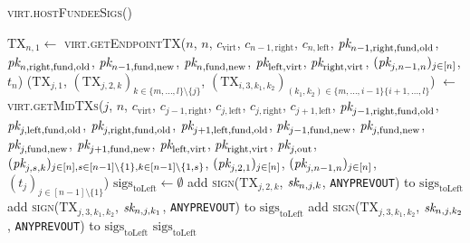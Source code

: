 \begin{center}
  \begin{processbox}{\textsc{virt.hostFundeeSigs}()}
    \begin{algorithmic}[1]
      \State $\mathrm{TX}_{n, 1} \gets$
      \textsc{virt}.\textsc{getEndpointTX}($n$, $n$, $c_{\mathrm{virt}}$,
      $c_{n-1, \mathrm{right}}$, $c_{n, \mathrm{left}}$, $\textit{pk}_{n-1,
      \mathrm{right}, \mathrm{fund}, \mathrm{old}}$, $\textit{pk}_{n, \mathrm{right},
      \mathrm{fund}, \mathrm{old}}$, $\textit{pk}_{n-1, \mathrm{fund}, \mathrm{new}}$,
      $\textit{pk}_{n, \mathrm{fund}, \mathrm{new}}$, $\textit{pk}_{\mathrm{left},
      \mathrm{virt}}$, $\textit{pk}_{\mathrm{right}, \mathrm{virt}}$, $(\textit{pk}_{j, n-1,
      n})_{j \in [n]}$, $t_n$)
      \label{code:virtual-layer:fundee-sigs:tx}
        \State ($\mathrm{TX}_{j, 1}$, $(\mathrm{TX}_{j, 2, k})_{k \in \{m,
        \dots, l\} \setminus \{j\}}$, $(\mathrm{TX}_{i, 3, k_1, k_2})_{(k_1,
        k_2) \in \{m, \dots, i-1\} \{i+1, \dots, l\}}$) $\gets$
        \textsc{virt.getMidTXs}($j$, $n$, $c_{\mathrm{virt}}$, $c_{j-1,
        \mathrm{right}}$, $c_{j, \mathrm{left}}$, $c_{j, \mathrm{right}}$,
        $c_{j+1, \mathrm{left}}$, $\textit{pk}_{j-1, \mathrm{right}, \mathrm{fund},
        \mathrm{old}}$, $\textit{pk}_{j, \mathrm{left}, \mathrm{fund}, \mathrm{old}}$,
        $\textit{pk}_{j, \mathrm{right}, \mathrm{fund}, \mathrm{old}}$, $\textit{pk}_{j+1,
        \mathrm{left}, \mathrm{fund}, \mathrm{old}}$, $\textit{pk}_{j-1, \mathrm{fund},
        \mathrm{new}}$, $\textit{pk}_{j, \mathrm{fund}, \mathrm{new}}$, $\textit{pk}_{j,
        \mathrm{fund}, \mathrm{new}}$, $\textit{pk}_{j+1, \mathrm{fund}, \mathrm{new}}$,
        $\textit{pk}_{\mathrm{left}, \mathrm{virt}}$, $\textit{pk}_{\mathrm{right},
        \mathrm{virt}}$, $\textit{pk}_{j, \mathrm{out}}$, $(\textit{pk}_{j,s,k})_{j \in [n], s \in
        [n-1] \setminus \{1\}, k \in [n-1] \setminus \{1, s\}}$, $(\textit{pk}_{j, 2,
        1})_{j \in [n]}$, $(\textit{pk}_{j, n-1, n})_{j \in [n]}$, $(t_j)_{j \in [n-1]
        \setminus \{1\}}$)
        \State $\mathrm{sigs}_{\mathrm{toLeft}} \gets \emptyset$
          \State add \textsc{sign}($\mathrm{TX}_{j, 2, k}$, $\textit{sk}_{n, j, k}$,
          \texttt{ANYPREVOUT}) to $\mathrm{sigs}_{\mathrm{toLeft}}$
        \EndFor
          \State add \textsc{sign}($\mathrm{TX}_{j, 3, k_1, k_2}$, $\textit{sk}_{n, j,
          k_1}$, \texttt{ANYPREVOUT}) to $\mathrm{sigs}_{\mathrm{toLeft}}$
          \State add \textsc{sign}($\mathrm{TX}_{j, 3, k_1, k_2}$, $\textit{sk}_{n, j,
          k_2}$, \texttt{ANYPREVOUT}) to $\mathrm{sigs}_{\mathrm{toLeft}}$
        \EndFor
      \EndFor
      \State \Return $\mathrm{sigs}_{\mathrm{toLeft}}$
    \end{algorithmic}
  \end{processbox}
  \label{code:virtual-layer:fundee-sigs}
\end{center} \ \\

